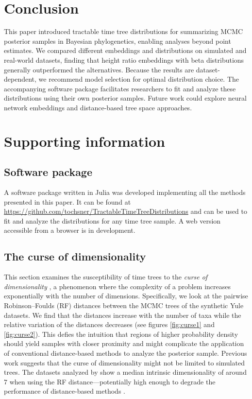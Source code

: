 \documentclass[10pt,letterpaper]{article}
\begin{document}
\section*{Conclusion}

This paper introduced tractable time tree distributions for summarizing MCMC posterior samples in Bayesian phylogenetics, enabling analyses beyond point estimates. We compared different embeddings and distributions on simulated and real-world datasets, finding that height ratio embeddings with beta distributions generally outperformed the alternatives. Because the results are dataset-dependent, we recommend model selection for optimal distribution choice. The accompanying software package facilitates researchers to fit and analyze these distributions using their own posterior samples. Future work could explore neural network embeddings and distance-based tree space approaches.

\section*{Supporting information}

\subsection*{Software package}

A software package written in Julia \cite{juliapackage} was developed implementing all the methods presented in this paper. It can be found at \url{https://github.com/tochsner/TractableTimeTreeDistributions} and can be used to fit and analyze the distributions for any time tree sample. A web version accessible from a browser is in development.

\subsection*{The curse of dimensionality}

This section examines the susceptibility of time trees to the \emph{curse of dimensionality} \cite{curse,curse2}, a phenomenon where the complexity of a problem increases exponentially with the number of dimensions. Specifically, we look at the pairwise Robinson–Foulds (RF) distances between the MCMC trees of the synthetic Yule datasets. We find that the distances increase with the number of taxa while the relative variation of the distances decreases (see figures \ref{fig:curse1} and \ref{fig:curse2}). This defies the intuition that regions of higher probability density should yield samples with closer proximity and might complicate the application of conventional distance-based methods to analyze the posterior sample. Previous work suggests that the curse of dimensionality might not be limited to simulated trees. The datasets analyzed by \cite{dimensionality} show a median intrinsic dimensionality of around $7$ when using the RF distance---potentially high enough to degrade the performance of distance-based methods \cite{curseimplications}.
\end{document}

